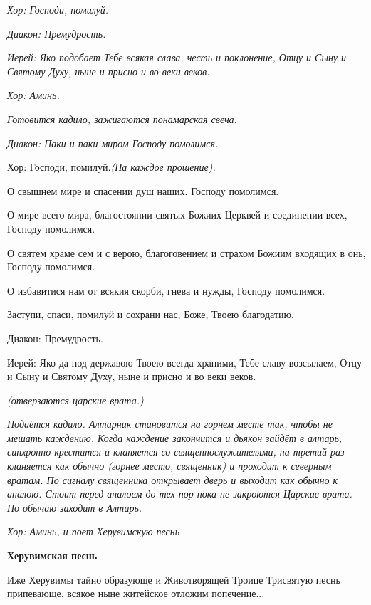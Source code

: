 \itshape Хор:\normalfont{} Господи, помилуй.


\itshape Диакон:\normalfont{} Премудрость.


\itshape  Иерей:\normalfont{} Яко подобает Тебе всякая слава, честь и поклонение, Отцу и Сыну и Святому Духу, ныне и присно и во веки веков.


\itshape  Хор:\normalfont{} Аминь.


\itshape  Готовится кадило, зажигаются понамарская свеча.\normalfont{}


 \itshape  Диакон:\normalfont{} Паки и паки миром Господу помолимся. \itshape  


  Хор:\normalfont{} Господи, помилуй.\itshape  (На каждое прошение)\normalfont{}. 


  О свышнем мире и спасении душ наших. Господу помолимся. 


  О мире всего мира, благостоянии святых Божиих Церквей и соединении всех, Господу помолимся. 


  О святем храме сем и с верою, благоговением и страхом Божиим входящих в онь, Господу помолимся. 


  О избавитися нам от всякия скорби, гнева и нужды, Господу помолимся. 


  Заступи, спаси, помилуй и сохрани нас, Боже, Твоею благодатию. \itshape 


  Диакон:\normalfont{} Премудрость. \itshape 


  Иерей:\normalfont{} Яко да под державою Твоею всегда храними, Тебе славу возсылаем, Отцу и Сыну и Святому Духу, ныне и присно и во веки веков. 


 \itshape (отверзаются царские врата.)\normalfont{}


 \itshape Подаётся кадило. Алтарник становится на горнем месте так, чтобы не мешать каждению. Когда каждение закончится и дьякон зайдёт в алтарь, синхронно крестится и кланяется со священнослужителями, на третий раз кланяется как обычно (горнее место, священник) и проходит к северным вратам. По сигналу священника открывает дверь и выходит как обычно к аналою. Стоит перед аналоем до тех пор пока не закроются Царские врата. По обычаю заходит в Алтарь\normalfont{}. 


\itshape  Хор:\normalfont{} Аминь, \itshape и поет Херувимскую песнь \normalfont{}


\medskip\bfseries Херувимская песнь \normalfont{}\nopagebreak


  Иже Херувимы тайно образующе и Животворящей Троице Трисвятую песнь припевающе, всякое ныне житейское отложим попечение... 



